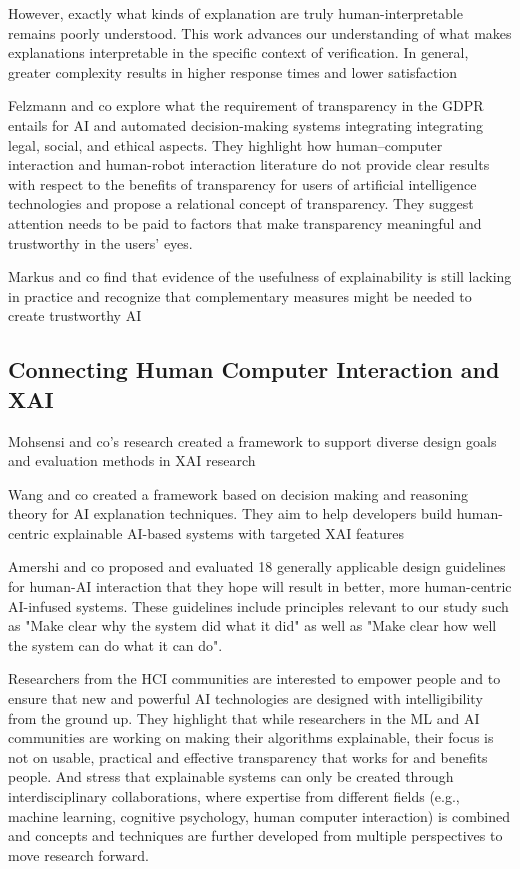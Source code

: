 \documentclass[manuscript,screen,review]{acmart}
\begin{document}
However, exactly what kinds of explanation are truly human-interpretable remains poorly understood.
This work advances our understanding of what makes explanations interpretable in the specific context of verification.
In general, greater complexity results in higher response times and lower satisfaction\cite{Narayanan2018}

Felzmann and co explore what the requirement of transparency in the GDPR entails for AI and automated decision-making systems integrating integrating legal, social, and ethical aspects.
They highlight how human–computer interaction and human-robot interaction literature do not provide clear results with respect to the benefits of transparency for users of artificial intelligence technologies
and propose a relational concept of transparency. 
They suggest attention needs to be paid to factors that make transparency meaningful and trustworthy in the users’ eyes.\cite{Felzmann2019}

Markus and co find that evidence of the usefulness of explainability is still lacking in practice and recognize that complementary measures might be needed to create trustworthy AI\cite{Markus2021}


\subsection{Connecting Human Computer Interaction and XAI}\label{subsec:human-computer-interaction-focused-xai}
Mohsensi and co's research created a framework to support diverse design goals and evaluation methods in XAI research\cite{Mohseni2021}

Wang and co created a framework based on decision making and reasoning theory for AI explanation techniques.
They aim to help developers build human-centric explainable AI-based systems with targeted XAI features\cite{Wang2019}

Amershi and co proposed and evaluated 18 generally applicable design guidelines for human-AI interaction that they hope will result in
better, more human-centric AI-infused systems. 
These guidelines include principles relevant to our study such as "Make clear why the system did what it did" as well as "Make clear how well the system can do what it can
do"\cite{Amershi2019}.

Researchers from the HCI communities are interested to empower people and to ensure that new and powerful AI technologies are designed with intelligibility from the ground up.
They highlight that while researchers in the ML and AI communities are working on making their algorithms explainable, their focus is not on usable, practical and effective transparency that works for and
benefits people.
And stress that explainable systems can only be created through interdisciplinary collaborations, where expertise from different
fields (e.g., machine learning, cognitive psychology, human computer interaction) is combined and concepts and techniques are further developed from multiple perspectives to
move research forward.\cite{Abdul2018}
\end{document}

